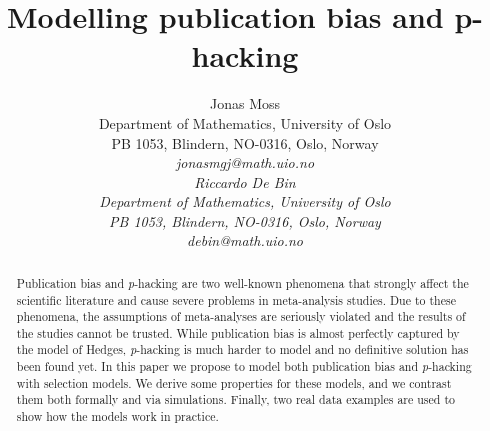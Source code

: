 \documentclass{article}
\title{Modelling publication bias and p-hacking}
\author{
  Jonas Moss \\
  Department of Mathematics, University of Oslo\\
  PB 1053, Blindern, NO-0316, Oslo, Norway \\
  \it{jonasmgj@math.uio.no} \\ 
     \And
  Riccardo De Bin \\
  Department of Mathematics, University of Oslo\\
  PB 1053, Blindern, NO-0316, Oslo, Norway \\
  \it{debin@math.uio.no} \\ 
}
\theoremstyle{plain}
\theoremstyle{definition}
\begin{document}
\maketitle
\begin{abstract}
Publication bias and \textit{p}-hacking are two well-known phenomena that strongly affect the scientific literature and cause severe problems in meta-analysis studies. Due to these phenomena, the assumptions of meta-analyses are seriously violated and the results of the studies cannot be trusted. While publication bias is almost perfectly captured by the model of Hedges, \textit{p}-hacking is much harder to model and no definitive solution has been found yet. In this paper we propose to model both publication bias and \textit{p}-hacking with selection models. We derive some properties for these models, and we contrast them both formally and via simulations. Finally, two real data examples are used to show how the models work in practice.
\end{abstract}








\end{document}

